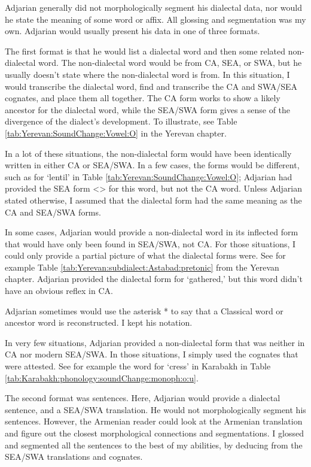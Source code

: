   Adjarian generally did not morphologically segment his dialectal data, nor would he state the meaning of some word or affix. All glossing and segmentation was my own. Adjarian would usually present his data in one of three formats. 


The first format is that he would list a dialectal word and then some related non-dialectal word. The non-dialectal word would be from CA, SEA, or SWA, but he usually doesn't state where the non-dialectal word is from. In this situation, I would transcribe the dialectal word, find and transcribe the CA and SWA/SEA cognates, and place them all together. The CA form works to show a likely ancestor for the dialectal word, while the SEA/SWA form gives a sense of the divergence of the dialect's development. To illustrate,  see Table \ref{tab:Yerevan:SoundChange:Vowel:O} in  the Yerevan chapter.  


In a lot of these situations, the non-dialectal form would have been identically written in either CA or SEA/SWA. In a few cases, the forms would be different, such as for `lentil' in Table \ref{tab:Yerevan:SoundChange:Vowel:O}; Adjarian had provided the SEA form <> for this word, but not the CA word. Unless Adjarian stated otherwise, I assumed that the dialectal form had the same meaning as the CA and SEA/SWA forms. 

In some cases, Adjarian would provide a non-dialectal word in its inflected form that would have only been found in SEA/SWA, not CA. For those situations, I could only provide a partial picture of what the dialectal forms were. See for example  Table \ref{tab:Yerevan:subdialect:Astabad:pretonic} from the Yerevan chapter. Adjarian provided the dialectal form for `gathered,' but this word didn't have an obvious reflex in CA. 

Adjarian sometimes would use the asterisk * to say that a Classical word or ancestor word is reconstructed. I kept his notation. 


In very few situations, Adjarian provided a non-dialectal form that was neither in CA nor modern SEA/SWA. In those situations, I simply used the cognates that were attested. See for example the word for `cress' in Karabakh in Table \ref{tab:Karabakh:phonology:soundChange:monoph:o:u}. 


The second format was   sentences. Here, Adjarian would provide a dialectal sentence, and a SEA/SWA translation. He would not morphologically segment his sentences. However, the Armenian reader could look at the Armenian translation and figure out the closest morphological connections and segmentations. I glossed and segmented all the sentences to the best of my abilities, by deducing from the SEA/SWA translations and cognates. 

